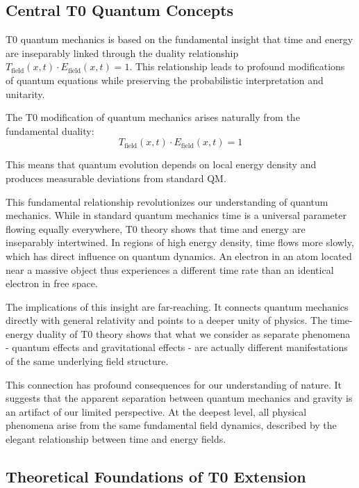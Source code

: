 \documentclass[12pt,a4paper]{article}
\theoremstyle{definition}
\theoremstyle{remark}
\begin{document}
\subsection{Central T0 Quantum Concepts}

T0 quantum mechanics is based on the fundamental insight that time and energy are inseparably linked through the duality relationship $T_{\text{field}}(x,t) \cdot E_{\text{field}}(x,t) = 1$. This relationship leads to profound modifications of quantum equations while preserving the probabilistic interpretation and unitarity.

\begin{tcolorbox}[colback=blue!5!white,colframe=blue!75!black,title=Central Insight]
	The T0 modification of quantum mechanics arises naturally from the fundamental duality:
	$$T_{\text{field}}(x,t) \cdot E_{\text{field}}(x,t) = 1$$
	
	This means that quantum evolution depends on local energy density and produces measurable deviations from standard QM.
\end{tcolorbox}

This fundamental relationship revolutionizes our understanding of quantum mechanics. While in standard quantum mechanics time is a universal parameter flowing equally everywhere, T0 theory shows that time and energy are inseparably intertwined. In regions of high energy density, time flows more slowly, which has direct influence on quantum dynamics. An electron in an atom located near a massive object thus experiences a different time rate than an identical electron in free space.

The implications of this insight are far-reaching. It connects quantum mechanics directly with general relativity and points to a deeper unity of physics. The time-energy duality of T0 theory shows that what we consider as separate phenomena - quantum effects and gravitational effects - are actually different manifestations of the same underlying field structure.

This connection has profound consequences for our understanding of nature. It suggests that the apparent separation between quantum mechanics and gravity is an artifact of our limited perspective. At the deepest level, all physical phenomena arise from the same fundamental field dynamics, described by the elegant relationship between time and energy fields.

\subsection{Theoretical Foundations of T0 Extension}
\end{document}
